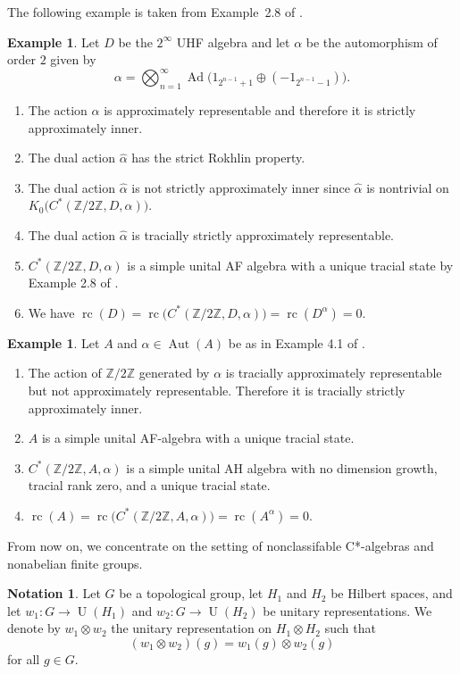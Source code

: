 \documentclass[10pt]{amsart}
\numberwithin{equation}{section}
\theoremstyle{definition}
\newtheorem{ntn}[thm]{Notation}
\newtheorem{exa}[thm]{Example}
\newcommand{\Aut}{{\operatorname{Aut}}}
\newcommand{\Ad}{{\operatorname{Ad}}}
\newcommand{\rc}{{\operatorname{rc}}}
\newcommand{\U}{{\operatorname{U}}}
\begin{document}
The following example is taken from Example~2.8 of \cite{Ph15}.
%
\begin{exa}\label{Ex_1_Z_2}
Let $D$ be the $2^{\infty}$ UHF algebra and let  $\alpha$ be the automorphism of order $2$ given by
\[
\alpha= \bigotimes_{n=1}^{\infty} \Ad \big(1_{2^{n-1} +1} \oplus (-1_{2^{n-1} -1})\big).
\]
\begin{enumerate}
\item
The action $\alpha$ is approximately representable
and therefore it is strictly approximately inner.
\item
The dual action $\widehat{\alpha}$ has the strict Rokhlin property.
\item
The dual action $\widehat{\alpha}$ is not strictly approximately inner 
since $\widehat{\alpha}$ is nontrivial on $K_0 \big( C^* (\mathbb{Z} /2\mathbb{Z}, D, \alpha) \big)$.
\item
The dual action $\widehat{\alpha}$ is tracially strictly approximately representable.
\item
$C^* (\mathbb{Z} /2\mathbb{Z}, D, \alpha)$ 
is a  simple unital AF algebra with a unique tracial state by Example 2.8 of \cite{Ph15}.
\item
We have 
$\rc (D)= \rc \big( C^* (\mathbb{Z} /2\mathbb{Z}, D, \alpha) \big)=\rc (D^{\alpha})=0$.
\end{enumerate}
\end{exa}
%
\begin{exa}\label{Ex_2_Z_2}
Let $A$ and $\alpha \in \Aut(A)$ be as in Example 4.1 of \cite{Ph15}.
\begin{enumerate}
\item
The action of $\mathbb{Z} /2\mathbb{Z}$ generated by $\alpha$ 
is tracially approximately representable but not approximately representable.
Therefore it is tracially strictly approximately inner.
\item
$A$ is a simple unital AF-algebra with a unique tracial state.
\item
$C^* (\mathbb{Z} /2\mathbb{Z}, A, \alpha)$ 
is a simple unital AH algebra with no dimension growth, tracial
rank zero, and a unique tracial state.
\item
$\rc (A)= \rc \big( C^* (\mathbb{Z} /2\mathbb{Z}, A, \alpha) \big)=\rc (A^{\alpha})=0$.
\end{enumerate}
\end{exa}
%
From now on, we concentrate on the setting of nonclassifable C*-algebras and nonabelian finite groups.
%
\begin{ntn}
Let $G$ be a topological group,
let $H_1$ and $H_2$ be Hilbert spaces,
and let $w_1 \colon G \to \U (H_1)$ and $w_2 \colon G \to \U (H_2)$
be unitary representations.
 We denote by $w_1 \otimes w_2$ the unitary
representation on $H_1 \otimes H_2$ such that 
\[
(w_1 \otimes w_2) (g) =
w_1 (g) \otimes w_2 (g)
\]
 for all $g \in G$.
\end{ntn}
\end{document}
